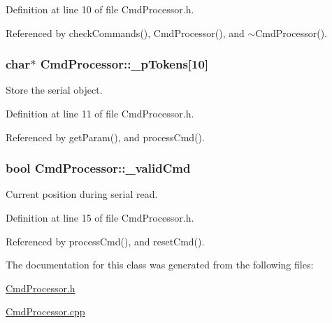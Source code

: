 Definition at line 10 of file CmdProcessor.h.



Referenced by checkCommands(), CmdProcessor(), and $\sim$CmdProcessor().

\hypertarget{class_cmd_processor_a2b857367533cd33ba9a68746c71c5e3d}{
\subsubsection[{\_\-pTokens}]{\setlength{\rightskip}{0pt plus 5cm}char$\ast$ {\bf CmdProcessor::\_\-pTokens}\mbox{[}10\mbox{]}}}
\label{class_cmd_processor_a2b857367533cd33ba9a68746c71c5e3d}


Store the serial object. 



Definition at line 11 of file CmdProcessor.h.



Referenced by getParam(), and processCmd().

\hypertarget{class_cmd_processor_a18b0886303779762a37096d6446aefa6}{
\subsubsection[{\_\-validCmd}]{\setlength{\rightskip}{0pt plus 5cm}bool {\bf CmdProcessor::\_\-validCmd}}}
\label{class_cmd_processor_a18b0886303779762a37096d6446aefa6}


Current position during serial read. 



Definition at line 15 of file CmdProcessor.h.



Referenced by processCmd(), and resetCmd().



The documentation for this class was generated from the following files:\begin{DoxyCompactItemize}
\item 
\hyperlink{_cmd_processor_8h}{CmdProcessor.h}\item 
\hyperlink{_cmd_processor_8cpp}{CmdProcessor.cpp}\end{DoxyCompactItemize}
